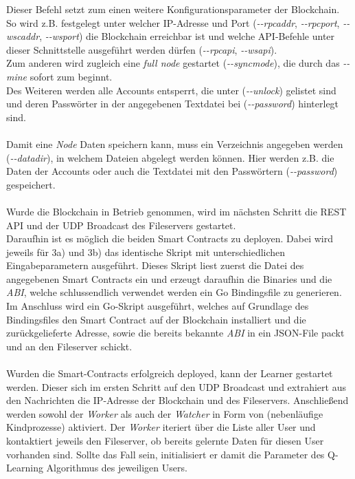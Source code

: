Dieser Befehl setzt zum einen weitere Konfigurationsparameter der Blockchain. So wird z.B. festgelegt unter welcher IP-Adresse und Port (\textit{-{}-rpcaddr}, \textit{-{}-rpcport}, \textit{-{}-wscaddr}, \textit{-{}-wsport}) die Blockchain erreichbar ist und welche API-Befehle unter dieser Schnittstelle ausgeführt werden dürfen (\textit{-{}-rpcapi}, \textit{-{}-wsapi}). \\
Zum anderen wird zugleich eine \textit{full node} gestartet (\textit{-{}-syncmode}), die durch das  \textit{-{}-mine} sofort zum  beginnt.\\
Des Weiteren werden alle Accounts entsperrt, die unter (\textit{-{}-unlock}) gelistet sind und deren Passwörter in der angegebenen Textdatei bei (\textit{-{}-password}) hinterlegt sind. \\\\
Damit eine \textit{Node} Daten speichern kann, muss ein Verzeichnis angegeben werden (\textit{-{}-datadir}), in welchem Dateien abgelegt werden können. Hier werden z.B. die Daten der Accounts oder auch die Textdatei mit den Passwörtern (\textit{-{}-password}) gespeichert.\\\\
Wurde die Blockchain in Betrieb genommen, wird im nächsten Schritt die REST API und der UDP Broadcast des Fileservers gestartet. \\
Daraufhin ist es möglich die beiden Smart Contracts zu deployen. Dabei wird jeweils für 3a) und 3b) das identische Skript mit unterschiedlichen Eingabeparametern ausgeführt. Dieses Skript liest zuerst die Datei des angegebenen Smart Contracts ein und erzeugt daraufhin die Binaries und die \textit{ABI}, welche schlussendlich verwendet werden ein Go Bindingsfile zu generieren.
Im Anschluss wird ein Go-Skript ausgeführt, welches auf Grundlage des Bindingsfiles den Smart Contract auf der Blockchain installiert und die zurückgelieferte Adresse, sowie die bereits bekannte \textit{ABI} in ein JSON-File packt und an den Fileserver schickt.\\\\
Wurden die Smart-Contracts erfolgreich deployed, kann der Learner gestartet werden. Dieser  sich im ersten Schritt auf den UDP Broadcast und extrahiert aus den Nachrichten die IP-Adresse der Blockchain und des Fileservers. Anschließend werden sowohl der \textit{Worker} als auch der \textit{Watcher} in Form von  (nebenläufige Kindprozesse) aktiviert. Der \textit{Worker} iteriert über die Liste aller User und kontaktiert jeweils den Fileserver, ob bereits gelernte Daten für diesen User vorhanden sind. Sollte das Fall sein, initialisiert er damit die Parameter des Q-Learning Algorithmus des jeweiligen Users.\\
